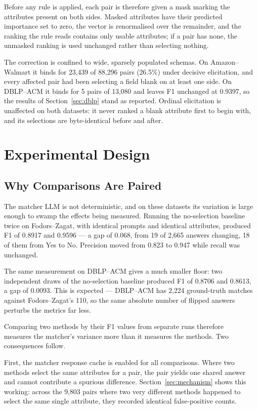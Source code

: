 \documentclass[11pt]{article}
\begin{document}
Before any rule is applied, each pair is therefore given a mask marking the attributes
present on both sides. Masked attributes have their predicted importance set to zero, the
vector is renormalised over the remainder, and the ranking the rule reads contains only
usable attributes; if a pair has none, the unmasked ranking is used unchanged rather than
selecting nothing.

The correction is confined to wide, sparsely populated schemas. On Amazon--Walmart it binds
for 23{,}439 of 88{,}296 pairs (26.5\%) under decisive elicitation, and every affected pair
had been selecting a field blank on at least one side. On DBLP--ACM it binds for 5 pairs of
13{,}080 and leaves F1 unchanged at 0.9397, so the results of Section~\ref{sec:dblp} stand
as reported. Ordinal elicitation is unaffected on both datasets: it never ranked a blank
attribute first to begin with, and its selections are byte-identical before and after.

\section{Experimental Design}
\label{sec:design}

\subsection{Why Comparisons Are Paired}
\label{sec:paired}

The matcher LLM is not deterministic, and on these datasets its variation is large enough to
swamp the effects being measured. Running the no-selection baseline twice on Fodors--Zagat,
with identical prompts and identical attributes, produced F1 of 0.8917 and 0.9596 --- a gap
of 0.068, from 19 of 2{,}665 answers changing, 18 of them from Yes to No. Precision moved
from 0.823 to 0.947 while recall was unchanged.

The same measurement on DBLP--ACM gives a much smaller floor: two independent draws of the
no-selection baseline produced F1 of 0.8706 and 0.8613, a gap of 0.0093. This is expected ---
DBLP--ACM has 2{,}224 ground-truth matches against Fodors--Zagat's 110, so the same absolute
number of flipped answers perturbs the metrics far less.

Comparing two methods by their F1 values from separate runs therefore measures the matcher's
variance more than it measures the methods. Two consequences follow.

First, the matcher response cache is enabled for all comparisons. Where two methods select
the same attributes for a pair, the pair yields one shared answer and cannot contribute a
spurious difference. Section~\ref{sec:mechanism} shows this working: across the 9{,}803 pairs
where two very different methods happened to select the same single attribute, they recorded
identical false-positive counts.
\end{document}
